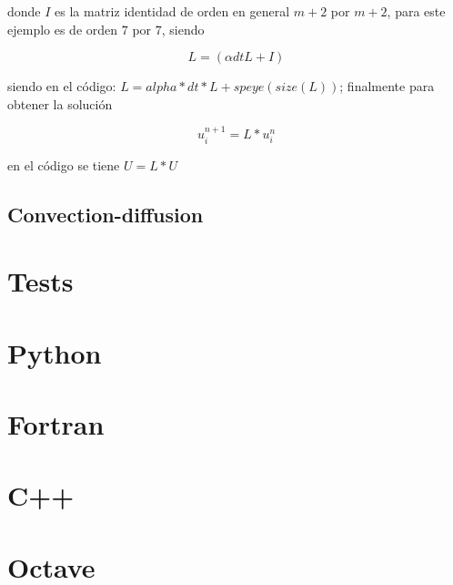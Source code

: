 \documentclass[a4paper,abstract=true]{scrreprt}
\begin{document}
donde $I$ es la matriz identidad de orden en general $m+2$ por $m+2$, para este ejemplo es de orden $7$ por $7$, siendo 

$$  L = (\alpha dt L +I )$$

siendo en el código: $ L = alpha*dt*L + speye(size(L))$; finalmente  para obtener la solución 

 \begin{equation}	
	u^{n+1}_{i} = L *u^{n}_{i}
\end{equation}
 
 en el código se tiene $ U = L*U$






\section{Convection-diffusion}

\chapter{Tests}

\chapter{Python}

\chapter{Fortran}

\chapter{C++}

\chapter{Octave}

\nocite{*}
\printbibliography[title={Referencias}]
\end{document}
